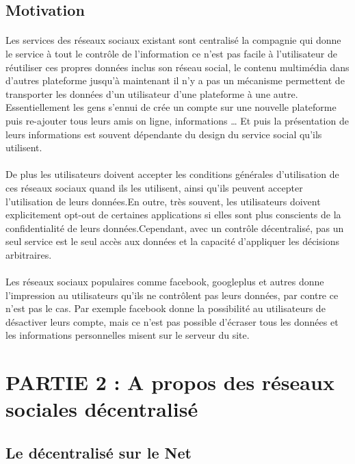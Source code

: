 \subsection{Motivation} 
\paragraph{}
Les services des réseaux sociaux existant sont centralisé la compagnie qui donne le service à tout le contrôle de l'information ce n'est pas facile à l'utilisateur de réutiliser ces propres données inclus son réseau social, le contenu multimédia dans d'autres plateforme jusqu'à maintenant il n'y a pas un mécanisme permettent de transporter les données d'un utilisateur d'une plateforme à une autre.
Essentiellement les gens s'ennui de crée un compte sur une nouvelle plateforme puis re-ajouter tous leurs amis on ligne, informations … 
Et puis la présentation de leurs informations est souvent dépendante du design du service social qu'ils utilisent.
\paragraph{}
De plus les utilisateurs doivent accepter les conditions générales d'utilisation de ces réseaux sociaux quand ils les utilisent, ainsi qu'ils peuvent accepter l'utilisation de leurs données.En outre, très souvent, les utilisateurs doivent explicitement opt-out de certaines applications si elles sont plus conscients de la confidentialité de leurs données.Cependant, avec un contrôle décentralisé, pas un seul service est le seul accès aux données et la capacité d'appliquer les décisions arbitraires.
\paragraph{}
Les réseaux sociaux populaires comme facebook, googleplus et autres donne l'impression au utilisateurs qu'ils ne contrôlent pas leurs données, par contre ce n'est pas le cas. Par exemple facebook donne la possibilité au utilisateurs de désactiver leurs compte, mais ce n'est pas possible d'écraser tous les données et les informations personnelles misent sur le serveur du site.

\newpage
\section{PARTIE 2 : A propos des réseaux sociales décentralisé }
\subsection{Le décentralisé sur le Net }

